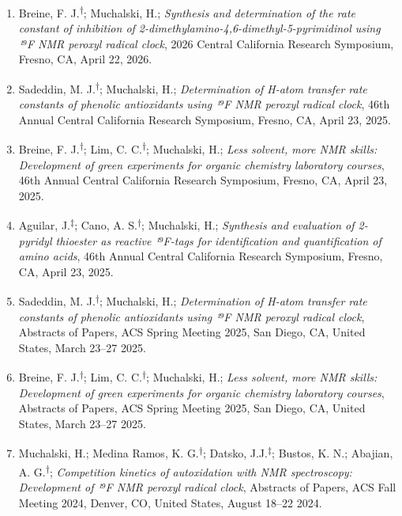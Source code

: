 \documentclass[11pt,letterpaper]{article}
\begin{document}
\begin{enumerate}[itemindent=0pt]
    \item{Breine, F. J.\textsuperscript{$\dagger$}; Muchalski, H.; \emph{Synthesis and determination of the rate constant of inhibition of 2-dimethylamino-4,6-dimethyl-5-pyrimidinol using ¹⁹F NMR peroxyl radical clock}, 2026 Central California Research Symposium, Fresno, CA, April 22, 2026.}

    \item{Sadeddin, M. J.\textsuperscript{$\dagger$}; Muchalski, H.; \emph{Determination of H-atom transfer rate constants of phenolic antioxidants using ¹⁹F NMR peroxyl radical clock}, 46th Annual Central California Research Symposium, Fresno, CA, April 23, 2025.}
  
    \item{Breine, F. J.\textsuperscript{$\dagger$}; Lim, C. C.\textsuperscript{$\dagger$}; Muchalski, H.; \emph{Less solvent, more NMR skills: Development of green experiments for organic chemistry laboratory courses}, 46th Annual Central California Research Symposium, Fresno, CA, April 23, 2025.}
    
    \item{Aguilar, J.\textsuperscript{$\ddagger$}; Cano, A. S.\textsuperscript{$\dagger$}; Muchalski, H.; \emph{Synthesis and evaluation of 2-pyridyl thioester as reactive ¹⁹F-tags for identification and quantification of amino acids}, 46th Annual Central California Research Symposium, Fresno, CA, April 23, 2025.}
  
    \item{Sadeddin, M. J.\textsuperscript{$\dagger$}; Muchalski, H.; \emph{Determination of H-atom transfer rate constants of phenolic antioxidants using ¹⁹F NMR peroxyl radical clock}, Abstracts of Papers, ACS Spring Meeting 2025, San Diego, CA, United States, March 23--27 2025.}
  
    \item{Breine, F. J.\textsuperscript{$\dagger$}; Lim, C. C.\textsuperscript{$\dagger$}; Muchalski, H.; \emph{Less solvent, more NMR skills: Development of green experiments for organic chemistry laboratory courses}, Abstracts of Papers, ACS Spring Meeting 2025, San Diego, CA, United States, March 23--27 2025.}
    
    \item{Muchalski, H.; Medina Ramos, K. G.\textsuperscript{$\dagger$}; Datsko, J.J.\textsuperscript{$\ddagger$}; Bustos, K. N.; Abajian, A. G.\textsuperscript{$\dagger$}; \emph{Competition kinetics of autoxidation with NMR spectroscopy: Development of ¹⁹F NMR peroxyl radical clock}, Abstracts of Papers, ACS Fall Meeting 2024, Denver, CO, United States, August 18--22 2024.}
  

\end{enumerate}
\end{document}
